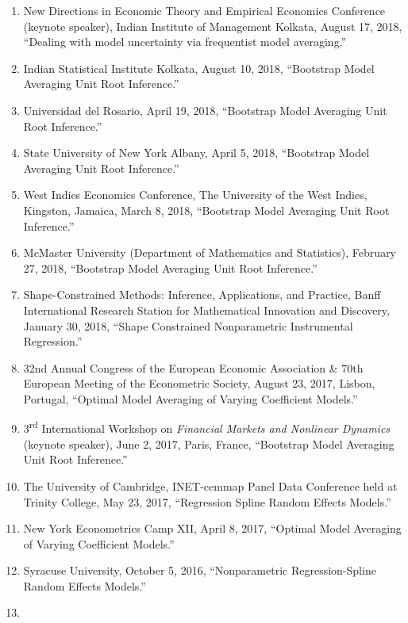 \documentclass[
]{article}
\begin{document}
\begin{enumerate}
  The 5th Conference of the International Symposia for Nonparametric
  Statistics, June 23, 2022, Paphos Cyprus, ``Boundary-Adaptive Kernel
  Density Estimation.''
\item
  New Directions in Economic Theory and Empirical Economics Conference
  (keynote speaker), Indian Institute of Management Kolkata, August 17,
  2018, ``Dealing with model uncertainty via frequentist model
  averaging.''
\item
  Indian Statistical Institute Kolkata, August 10, 2018, ``Bootstrap
  Model Averaging Unit Root Inference.''
\item
  Universidad del Rosario, April 19, 2018, ``Bootstrap Model Averaging
  Unit Root Inference.''
\item
  State University of New York Albany, April 5, 2018, ``Bootstrap Model
  Averaging Unit Root Inference.''
\item
  West Indies Economics Conference, The University of the West Indies,
  Kingston, Jamaica, March 8, 2018, ``Bootstrap Model Averaging Unit
  Root Inference.''
\item
  McMaster University (Department of Mathematics and Statistics),
  February 27, 2018, ``Bootstrap Model Averaging Unit Root Inference.''
\item
  Shape-Constrained Methods: Inference, Applications, and Practice,
  Banff International Research Station for Mathematical Innovation and
  Discovery, January 30, 2018, ``Shape Constrained Nonparametric
  Instrumental Regression.''
\item
  32nd Annual Congress of the European Economic Association \& 70th
  European Meeting of the Econometric Society, August 23, 2017, Lisbon,
  Portugal, ``Optimal Model Averaging of Varying Coefficient Models.''
\item
  3\textsuperscript{rd} International Workshop on \emph{Financial
  Markets and Nonlinear Dynamics} (keynote speaker), June 2, 2017,
  Paris, France, ``Bootstrap Model Averaging Unit Root Inference.''
\item
  The University of Cambridge, INET-cemmap Panel Data Conference held at
  Trinity College, May 23, 2017, ``Regression Spline Random Effects
  Models.''
\item
  New York Econometrics Camp XII, April 8, 2017, ``Optimal Model
  Averaging of Varying Coefficient Models.''
\item
  Syracuse University, October 5, 2016, ``Nonparametric
  Regression-Spline Random Effects Models.''
\item

\end{enumerate}
\end{document}
